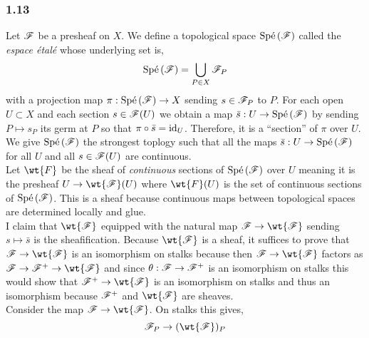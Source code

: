 \documentclass[12pt]{article}
\begin{document}
\subsubsection{1.13}

\newcommand{\Spe}[1]{\text{Sp\'{e}}\left( #1 \right)}

Let $\mathscr{F}$ be a presheaf on $X$. We define a topological space $\Spe{\F}$ called the \textit{espace \'{e}tal\'{e}} whose underlying set is,
\[ \Spe{\F} = \bigcup_{P \in X} \F_P \]
with a projection map $\pi : \Spe{\F} \to X$ sending $s \in \mathscr{F}_P$ to $P$. For each open $U \subset X$ and each section $s \in \mathscr{F}(U)$ we obtain a map $\bar{s} : U \to \Spe{\F}$ by sending $P \mapsto s_P$ its germ at $P$ so that $\pi \circ \bar{s} = \mathrm{id}_U$. Therefore, it is a ``section'' of $\pi$ over $U$. We give $\Spe{\F}$ the strongest toplogy such that all the maps $\bar{s} : U \to \Spe{\F}$ for all $U$ and all $s \in \mathscr{F}(U)$ are continuous. 
\bigskip\\
Let $\wt{F}$ be the sheaf of \textit{continuous} sections of $\Spe{\F}$ over $U$ meaning it is the presheaf $U \to \wt{\F}(U)$ where $\wt{F}(U)$ is the set of continuous sections of $\Spe{\F}$. This is a sheaf because continuous maps between topological spaces are determined locally and glue.
\bigskip\\
I claim that $\wt{\F}$ equipped with the natural map $\F \to \wt{\F}$ sending $s \mapsto \bar{s}$ is the sheafification. Because $\wt{\F}$ is a sheaf, it suffices to prove that $\F \to \wt{\F}$ is an isomorphism on stalks because then $\F \to \wt{\F}$ factors as $\F \to \F^+ \to \wt{\F}$ and since $\theta : \mathscr{F} \to \mathscr{F}^+$ is an isomorphism on stalks this would show that $\F^+ \to \wt{\F}$ is an isomorphism on stalks and thus an isomorphism because $\mathscr{F}^+$ and $\wt{\F}$ are sheaves. 
\bigskip\\
Consider the map $\F \to \wt{\F}$. On stalks this gives,
\[ \F_P \to (\wt{\F})_P \]
\end{document}

